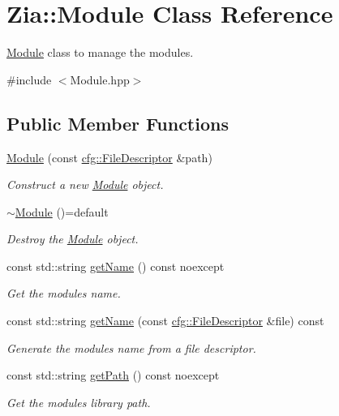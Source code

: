 \hypertarget{class_zia_1_1_module}{}\section{Zia\+:\+:Module Class Reference}
\label{class_zia_1_1_module}


\hyperlink{class_zia_1_1_module}{Module} class to manage the modules.  




{\ttfamily \#include $<$Module.\+hpp$>$}

\subsection*{Public Member Functions}
\begin{DoxyCompactItemize}
\item 
\hyperlink{class_zia_1_1_module_a4e5330e20703c939d940afe737bd4d1b}{Module} (const \hyperlink{namespacecfg_af0aed6e47bd26e91ad7d69467f96caaf}{cfg\+::\+File\+Descriptor} \&path)
\begin{DoxyCompactList}\small\item\em Construct a new \hyperlink{class_zia_1_1_module}{Module} object. \end{DoxyCompactList}\item 
\hyperlink{class_zia_1_1_module_a91f712e682b2b949656b90796879d8b1}{$\sim$\+Module} ()=default
\begin{DoxyCompactList}\small\item\em Destroy the \hyperlink{class_zia_1_1_module}{Module} object. \end{DoxyCompactList}\item 
const std\+::string \hyperlink{class_zia_1_1_module_ac0eaf9796e9cb65c279743f3c6377b1b}{get\+Name} () const noexcept
\begin{DoxyCompactList}\small\item\em Get the module\textquotesingle{}s name. \end{DoxyCompactList}\item 
const std\+::string \hyperlink{class_zia_1_1_module_a93f4a37a5e91739c2584292e540d6dff}{get\+Name} (const \hyperlink{namespacecfg_af0aed6e47bd26e91ad7d69467f96caaf}{cfg\+::\+File\+Descriptor} \&file) const
\begin{DoxyCompactList}\small\item\em Generate the module\textquotesingle{}s name from a file descriptor. \end{DoxyCompactList}\item 
const std\+::string \hyperlink{class_zia_1_1_module_ae9e284d2b324100926271ca383704552}{get\+Path} () const noexcept
\begin{DoxyCompactList}\small\item\em Get the module\textquotesingle{}s library path. \end{DoxyCompactList}\end{DoxyCompactItemize}



